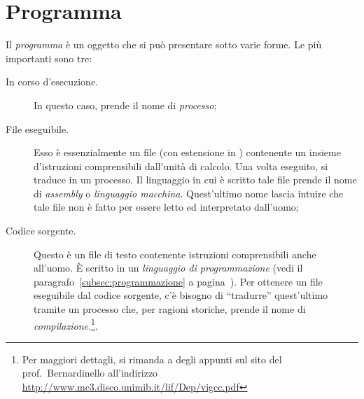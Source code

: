 	\section{Programma}
Il \emph{programma} è un oggetto che si può presentare sotto varie forme. Le più importanti sono tre:
\begin{description}
	\item[In corso d'esecuzione.] In questo caso, prende il nome di \emph{processo};
	\item[File eseguibile.] Esso è essenzialmente un file (con estensione  in ) contenente un insieme d'istruzioni comprensibili dall'unità di calcolo. Una volta eseguito, si traduce in un processo. Il linguaggio in cui è scritto tale file prende il nome di \emph{assembly} o \emph{linguaggio macchina}. Quest'ultimo nome lascia intuire che tale file non è fatto per essere letto ed interpretato dall'uomo;
	\item[Codice sorgente.] Questo è un file di testo contenente istruzioni comprensibili anche all'uomo. \`E scritto in un \emph{linguaggio di programmazione} (vedi il paragrafo~\ref{subsec:programmazione} a pagina~\pageref{subsec:programmazione}). Per ottenere un file eseguibile dal codice sorgente, c'è bisogno di ``tradurre'' quest'ultimo tramite un processo che, per ragioni storiche, prende il nome di \emph{compilazione}.\footnote{Per maggiori dettagli, si rimanda a degli appunti sul sito del prof.~Bernardinello all'indirizzo \url{http://www.mc3.disco.unimib.it/lif/Dep/vigcc.pdf}}.
\end{description}